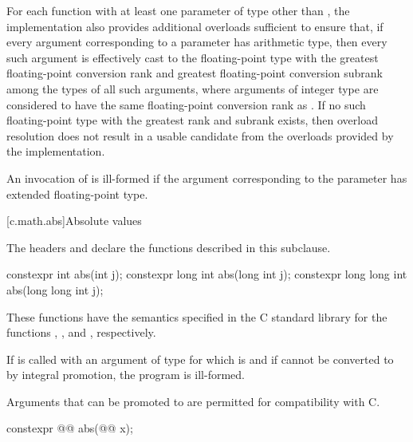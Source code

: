 \pnum
For each function
with at least one parameter of type 
other than ,
the implementation also provides additional overloads sufficient to ensure that,
if every argument corresponding to
a  parameter has arithmetic type,
then every such argument is effectively cast to the floating-point type
with the greatest floating-point conversion rank and
greatest floating-point conversion subrank
among the types of all such arguments,
where arguments of integer type are considered to have
the same floating-point conversion rank as .
If no such floating-point type with the greatest rank and subrank exists,
then overload resolution does not result in
a usable candidate
from the overloads provided by the implementation.

\pnum
An invocation of  is ill-formed if
the argument corresponding to the  parameter
has extended floating-point type.


[c.math.abs]{Absolute values}

\pnum
\begin{note}
The headers  and
declare the functions described in this subclause.
\end{note}

%
\begin{itemdecl}
constexpr int abs(int j);
constexpr long int abs(long int j);
constexpr long long int abs(long long int j);
\end{itemdecl}

\begin{itemdescr}
\pnum
\effects
These
functions have the semantics specified in the C standard library
for the functions , , and , respectively.

\pnum
\remarks
If  is called with an argument of type 
for which  is  and
if  cannot be converted to 
by integral promotion, the program is ill-formed.
\begin{note}
Arguments that can be promoted to  are permitted for compatibility with C.
\end{note}
\end{itemdescr}

\begin{itemdecl}
constexpr @@ abs(@@ x);
\end{itemdecl}

